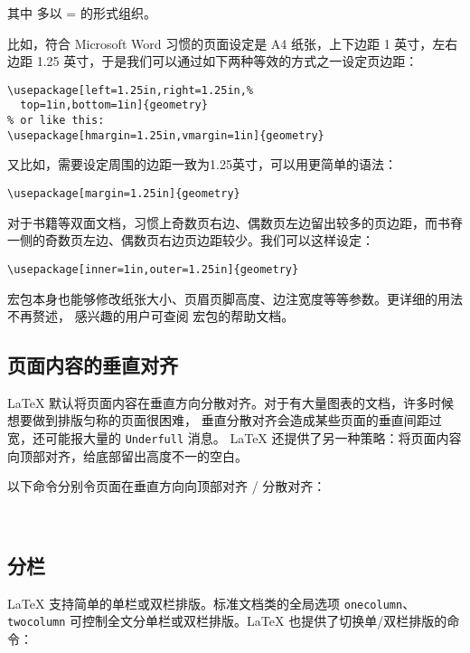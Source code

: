 其中  多以 = 的形式组织。

比如，符合 Microsoft Word 习惯的页面设定是 A4 纸张，上下边距 1 英寸，左右边距 1.25 英寸，于是我们可以通过如下两种等效的方式之一设定页边距：
\begin{verbatim}
\usepackage[left=1.25in,right=1.25in,%
  top=1in,bottom=1in]{geometry}
% or like this:
\usepackage[hmargin=1.25in,vmargin=1in]{geometry}
\end{verbatim}

又比如，需要设定周围的边距一致为1.25英寸，可以用更简单的语法：
\begin{verbatim}
\usepackage[margin=1.25in]{geometry}
\end{verbatim}

对于书籍等双面文档，习惯上奇数页右边、偶数页左边留出较多的页边距，而书脊一侧的奇数页左边、偶数页右边页边距较少。我们可以这样设定：
\begin{verbatim}
\usepackage[inner=1in,outer=1.25in]{geometry}
\end{verbatim}

 宏包本身也能够修改纸张大小、页眉页脚高度、边注宽度等等参数。更详细的用法不再赘述，
感兴趣的用户可查阅  宏包的帮助文档。

\subsection{页面内容的垂直对齐}\label{subsec:raggedbottom}

\LaTeX{} 默认将页面内容在垂直方向分散对齐。对于有大量图表的文档，许多时候想要做到排版匀称的页面很困难，
垂直分散对齐会造成某些页面的垂直间距过宽，还可能报大量的 \texttt{Underfull}  消息。
\LaTeX{} 还提供了另一种策略：将页面内容向顶部对齐，给底部留出高度不一的空白。

以下命令分别令页面在垂直方向向顶部对齐 / 分散对齐：
\begin{command}
 \\
\end{command}

\subsection{分栏}\label{subsec:columns}

\LaTeX{} 支持简单的单栏或双栏排版。标准文档类的全局选项 \texttt{onecolumn}、\texttt{twocolumn}
可控制全文分单栏或双栏排版。\LaTeX{} 也提供了切换单/双栏排版的命令：
\begin{command}
 \\
\end{command}


